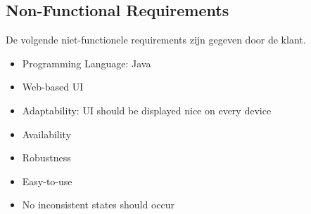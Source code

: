 \documentclass[•]{article}
\begin{document}
\subsection{Non-Functional Requirements}
De volgende niet-functionele requirements zijn gegeven door de klant.
\begin{itemize}
\item Programming Language: Java
\item Web-based UI
\item Adaptability: UI should be displayed nice on every device
\item Availability
\item Robustness
\item Easy-to-use
\item No inconsistent states should occur
\end{itemize}
\end{document}
